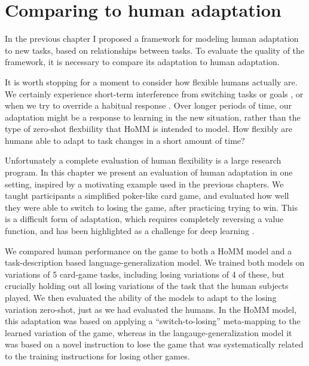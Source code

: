 \chapter{Comparing to human adaptation} \label{chapter:human}

In the previous chapter I proposed a framework for modeling human adaptation to new tasks, based on relationships between tasks. To evaluate the quality of the framework, it is necessary to compare its adaptation to human adaptation. \par
It is worth stopping for a moment to consider how flexible humans actually are. We certainly experience short-term interference from switching tasks or goals \citep{Rogers1995}, or when we try to override a habitual response \citep{Stroop1935, MacLeod1991}. Over longer periods of time, our adaptation might be a response to learning in the new situation, rather than the type of zero-shot flexbiility that HoMM is intended to model. How flexibly are humans able to adapt to task changes in a short amount of time? \par
Unfortunately a complete evaluation of human flexibility is a large research program. In this chapter we present an evaluation of human adaptation in one setting, inspired by a motivating example used in the previous chapters. We taught participants a simplified poker-like card game, and evaluated how well they were able to switch to losing the game, after practicing trying to win. This is a difficult form of adaptation, which requires completely reversing a value function, and has been highlighted as a challenge for deep learning \citep{Lake2016}.\par
We compared human performance on the game to both a HoMM model and a task-description based language-generalization model. We trained both models on variations of 5 card-game tasks, including losing variations of 4 of these, but crucially holding out all losing variations of the task that the human subjects played. We then evaluated the ability of the models to adapt to the losing variation zero-shot, just as we had evaluated the humans. In the HoMM model, this adaptation was based on applying a ``switch-to-losing'' meta-mapping to the learned variation of the game, whereas in the langauge-generalization model it was based on a novel instruction to lose the game that was systematically related to the training instructions for losing other games.\par 

